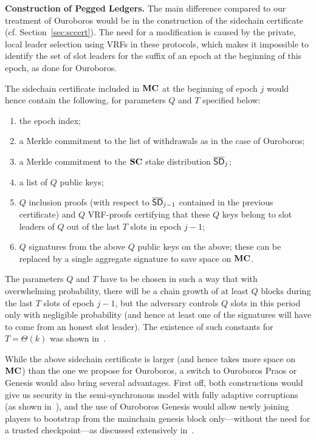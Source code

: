 \noindent
\textbf{Construction of Pegged Ledgers.}
The main difference compared to our treatment of Ouroboros
would be in the construction of the sidechain certificate
(cf. Section~\ref{sec:sccert}). The need for a modification is caused by the
private, local leader selection using VRFs in these protocols, which makes it
impossible to identify the set of slot leaders for the suffix of an epoch at the
beginning of this epoch, as done for Ouroboros.

The sidechain certificate included in $\mathbf{MC}$ at the beginning of epoch $j$
would hence contain the following, for parameters $Q$ and $T$ specified below:
\begin{enumerate}
\item
the epoch index;
\item
a Merkle commitment to the list of withdrawals as in the case of Ouroboros;
\item
a Merkle commitment to the $\mathbf{SC}$ stake distribution $\mathsf{\overline{SD}}_{j}$;
\item
a list of $Q$ public keys;
\item
$Q$ inclusion proofs (with respect to $\mathsf{\overline{SD}}_{j-1}$ contained in the previous
certificate) and $Q$ VRF-proofs certifying that these $Q$ keys belong
to slot leaders of $Q$ out of the last $T$ slots in epoch $j-1$;
\item
$Q$ signatures from the above $Q$ public keys on the above; these can be
replaced by a single aggregate signature to save space on $\mathbf{MC}$.
\end{enumerate}

The parameters $Q$ and $T$ have to be chosen in such a way that with
overwhelming probability, there will be a chain growth of at least $Q$ blocks
during the last $T$ slots of epoch $j-1$,
but the adversary controls $Q$ slots in this period only
with negligible probability (and hence at least one of the signatures will have
to come from an honest slot leader).
The existence of such constants for $T=\Theta(k)$ was shown in~\cite{genesis}.

While the above sidechain certificate is larger (and hence takes more space on
$\mathbf{MC}$) than the one we propose for Ouroboros, a switch to Ouroboros
Praos or Genesis would also bring several advantages. First off, both
constructions would give us security in the semi-synchronous model with fully
adaptive corruptions (as shown in~\cite{EC:DGKR18,genesis}),
and the use of
Ouroboros Genesis would allow newly joining players to bootstrap from the
mainchain genesis block only---without the need for a trusted checkpoint---as discussed
extensively in~\cite{genesis}.

